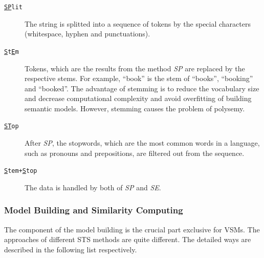 \begin{description}
\item[\texttt{\underline{SP}lit}] The string is splitted into a sequence of tokens by the special characters (whitespace, hyphen and punctuations). 
\item[\texttt{\underline{S}t\underline{E}m}] Tokens, which are the results from the method \textit{SP} are replaced by the respective stems. For example, ``book'' is the stem of ``books'', ``booking'' and ``booked''. The advantage of stemming is to reduce the vocabulary size and decrease computational complexity and avoid overfitting of building semantic models. However, stemming causes the problem of polysemy. 
\item[\texttt{\underline{ST}op}] After \textit{SP}, the stopwords, which are the most common words in a language, such as pronouns and prepositions, are filtered out from the sequence. 
\item[\texttt{\underline{S}tem+\underline{S}top}] The data is handled by both of \textit{SP} and \textit{SE}. 
\end{description}

\subsubsection{Model Building and Similarity Computing}

The component of the model building is the crucial part exclusive for VSMs. The approaches of different STS methods are quite different. The detailed ways are described in the following list respectively.

